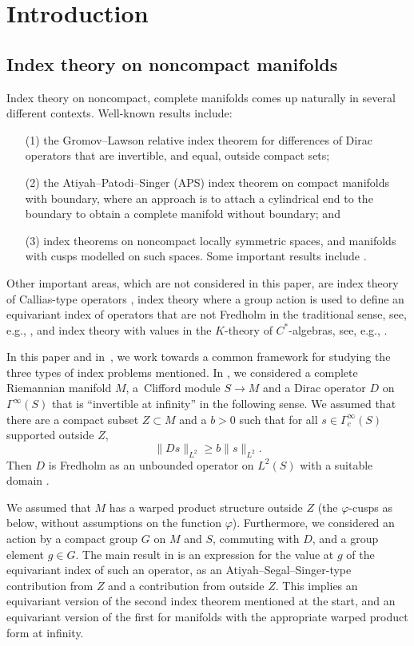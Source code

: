 \documentclass[pdftex]{sigma}%
\numberwithin{equation}{section}
\begin{document}
\section{Introduction}

\subsection*{Index theory on noncompact manifolds}

Index theory on noncompact, complete manifolds comes up naturally in several different contexts. Well-known results include:
\begin{enumerate}\itemsep=0pt
\item[(1)] the Gromov--Lawson relative index theorem \cite{Gromov83} for differences of Dirac operators that are invertible, and equal, outside compact sets;
\item[(2)] the Atiyah--Patodi--Singer (APS) index theorem \cite{APS1, Donnelly} on compact manifolds with boundary, where an approach is to attach a cylindrical end to the boundary to obtain a complete manifold without boundary; and
\item[(3)] index theorems on noncompact locally symmetric spaces, and manifolds with cusps modelled on such spaces. Some important results include \cite{BM, Moscovici82, Muller83, Muller87, Stern89}.
\end{enumerate}
Other important areas, which are not considered in this paper, are
index theory of Callias-type operators \cite{Anghel89, Anghel93, Bott78, Bunke95, Callias78, Kucerovsky01}, index theory where a group action is used to define an equivariant index of operators that are not Fredholm in the traditional sense, see, e.g., \cite{Atiyah74, Braverman02}, and index theory with values in the $K$-theory of $C^*$-algebras, see, e.g., \cite{Connes94}.

In this paper and in~\cite{HW21a}, we work towards a common framework for studying the three types of index problems mentioned. In \cite{HW21a}, we considered a complete Riemannian manifold $M$, a~Clifford module $S \to M$ and a Dirac operator $D$ on $\Gamma^{\infty}(S)$ that is ``invertible at infinity'' in the following sense. We assumed that there are a compact subset $Z \subset M$ and a $b>0$ such that for all $s \in \Gamma_c^{\infty}(S)$ supported outside $Z$,
\[
\|Ds\|_{L^2} \geq b \|s\|_{L^2}.
\]
Then $D$ is Fredholm as an unbounded operator on $L^2(S)$ with a suitable domain \cite{Anghel93b, Gromov83}.

We assumed that $M$ has a warped product structure outside $Z$ (the $\varphi$-cusps as below, without assumptions on the function $\varphi$).
Furthermore, we considered an action by a compact group $G$ on $M$ and $S$, commuting with $D$, and a group element $g \in G$. The main result in \cite{HW21a} is an expression for the value at $g$ of the equivariant index of such an operator, as an Atiyah--Segal--Singer-type contribution from $Z$ and a contribution from outside $Z$. This implies an equivariant version of the second index theorem mentioned at the start, and an equivariant version of the first for manifolds with the appropriate warped product form at infinity.
\end{document}
